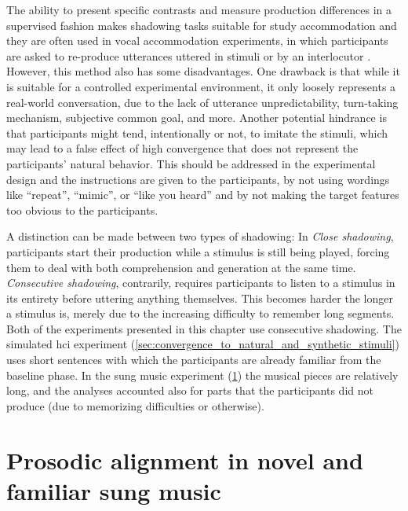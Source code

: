 The ability to present specific contrasts and measure production differences in a supervised fashion makes shadowing tasks suitable for study accommodation and they are often used in vocal accommodation experiments, in which participants are asked to re-produce utterances uttered in stimuli or by an interlocutor \citep[e.g.,][]{Pardo2018comparison, Babel2014novelty, Shockley2004imitation, Walker2015repeat, Dias2016visibilivty, Dias2016visibilivty}.
However, this method also has some disadvantages.
One drawback is that while it is suitable for a controlled experimental environment, it only loosely represents a real-world conversation, due to the lack of utterance unpredictability, turn-taking mechanism, subjective common goal, and more.
Another potential hindrance is that participants might tend, intentionally or not, to imitate the stimuli, which may lead to a false effect of high convergence that does not represent the participants' natural behavior.
This should be addressed in the experimental design and the instructions are given to the participants, by not using wordings like \enquote{repeat}, \enquote{mimic}, or \enquote{like you heard} and by not making the target features too obvious to the participants.

A distinction can be made between two types of shadowing:
In \emph{Close shadowing}, participants start their production while a stimulus is still being played, forcing them to deal with both comprehension and generation at the same time.
\emph{Consecutive shadowing}, contrarily, requires participants to listen to a stimulus in its entirety before uttering anything themselves.
This becomes harder the longer a stimulus is, merely due to the increasing difficulty to remember long segments.
Both of the experiments presented in this chapter use consecutive shadowing.
The simulated \ac{hci} experiment (\cref{sec:convergence_to_natural_and_synthetic_stimuli}) uses short sentences with which the participants are already familiar from the baseline phase.
In the sung music experiment (\cref{sec:alignment_in_novel_and_familiar_sung_music}) the musical pieces are relatively long, and the analyses accounted also for parts that the participants did not produce (due to memorizing difficulties or otherwise).

\section{Prosodic alignment in novel and familiar sung music}
\label{sec:alignment_in_novel_and_familiar_sung_music}

